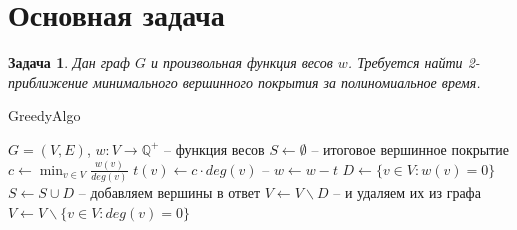 \documentclass{article}
\newtheorem{task}{Задача}
\theoremstyle{definition}
\begin{document}
  \section{Основная задача}
  \begin{task}
    Дан граф $G$ и произвольная функция весов $w$. 
    Требуется найти 2-приближение минимального вершинного покрытия за полиномиальное время.
  \end{task}
  \begin{algorithm}[H]
    \caption{GreedyAlgo}\label{greedyAlgo}
    \begin{algorithmic}
      \Require $G = (V, E)$, $w:V \rightarrow \mathbb{Q}^+$ -- функция весов
      \State $S \gets \emptyset$ -- итоговое вершинное покрытие
        \State $c \gets \min_{v \in V}\frac{w(v)}{deg(v)}$
        \State $t(v) \gets c\cdot deg(v)$ --         
        \State $w \gets w - t$
        \State $D \gets \{v\in V: w(v) = 0\}$
        \State $S \gets S \cup D$ -- добавляем вершины в ответ
        \State $V \gets V \backslash D$ -- и удаляем их из графа
        \State $V \gets V \backslash \{v \in V: deg(v) = 0\}$ 
      \EndWhile\\
    \end{algorithmic}
  \end{algorithm}
\end{document}
